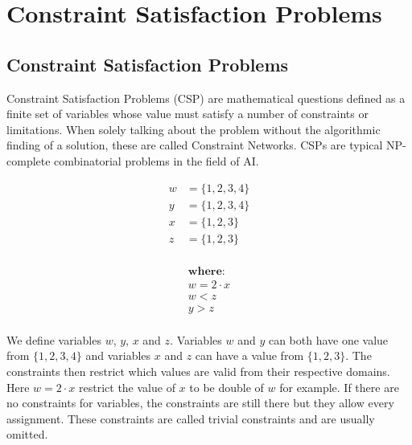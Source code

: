 \chapter{Constraint Satisfaction Problems} \label{chap:CSP}

\section{Constraint Satisfaction Problems}

Constraint Satisfaction Problems (CSP) \cite{csp:1987} are mathematical questions defined as a finite set of variables whose value must satisfy a number of constraints or limitations. When solely talking about the problem without the algorithmic finding of a solution, these are called Constraint Networks. CSPs are typical NP-complete combinatorial problems in the field of AI.

\begin{tcolorbox}[title=Example:]
	\begin{multicols}{2}
		\begin{equation*}
			\begin{aligned}
				w & = \{1, 2, 3, 4\} \\
				y & = \{1, 2, 3, 4\} \\
				x & = \{1, 2, 3\}    \\
				z & = \{1, 2, 3\}    \\
			\end{aligned}
		\end{equation*}

		\columnbreak

		\noindent
		\begin{equation*}
			\begin{aligned}
				\textbf{where:} \\
				w = 2 \cdot x   \\
				w < z           \\
				y > z           \\
			\end{aligned}
		\end{equation*}
	\end{multicols}
\end{tcolorbox}

We define variables $w$, $y$, $x$ and $z$. Variables $w$ and $y$ can both have one value from $\{1, 2, 3, 4\}$ and variables $x$ and $z$ can have a value from $\{1, 2, 3\}$. The constraints then restrict which values are valid from their respective domains. Here $w = 2 \cdot x$ restrict the value of $x$ to be double of $w$ for example. If there are no constraints for variables, the constraints are still there but they allow every assignment. These constraints are called trivial constraints and are usually omitted.

